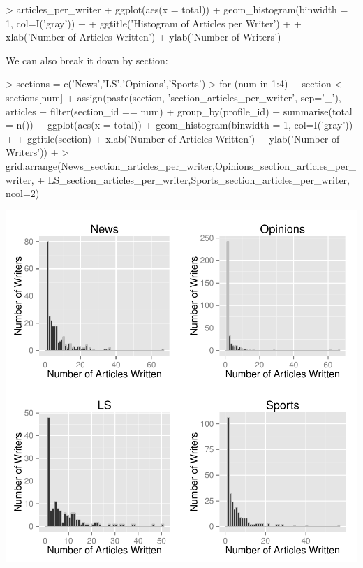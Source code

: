 \documentclass[a4paper]{article}
\begin{document}
\begin{Schunk}
\begin{Sinput}
> articles_per_writer %
+   ggplot(aes(x = total)) + geom_histogram(binwidth = 1, col=I('gray')) +
+   ggtitle('Histogram of Articles per Writer') +
+   xlab('Number of Articles Written') + ylab('Number of Writers')
\end{Sinput}
\end{Schunk}


We can also break it down by section:

\begin{Schunk}
\begin{Sinput}
> sections = c('News','LS','Opinions','Sports')
> for (num in 1:4) {
+   section <- sections[num]
+   assign(paste(section, 'section_articles_per_writer', sep='_'), articles %
+     filter(section_id == num) %
+     group_by(profile_id) %
+     summarise(total = n()) %
+     ggplot(aes(x = total)) + geom_histogram(binwidth = 1, col=I('gray')) +
+     ggtitle(section) + xlab('Number of Articles Written') + ylab('Number of Writers'))
+ }
> grid.arrange(News_section_articles_per_writer,Opinions_section_articles_per_writer,
+              LS_section_articles_per_writer,Sports_section_articles_per_writer, ncol=2)
\end{Sinput}
\end{Schunk}
\includegraphics{FinalProject-019}
\end{document}
